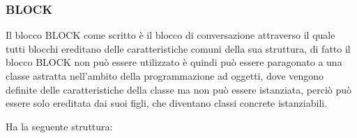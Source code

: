 \subsubsection{BLOCK}

Il blocco BLOCK come scritto è il blocco di conversazione attraverso il quale tutti blocchi ereditano delle caratteristiche comuni della sua struttura, di fatto il blocco BLOCK non può essere utilizzato è quindi può essere paragonato a una classe astratta nell'ambito della programmazione ad oggetti, dove vengono definite delle caratteristiche della classe ma non può essere istanziata, perciò può essere solo ereditata dai suoi figli, che diventano classi concrete istanziabili.


Ha la seguente struttura:

